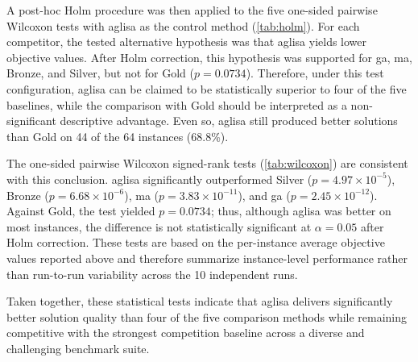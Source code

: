\documentclass[preprint,12pt]{elsarticle}
\begin{document}
A post-hoc Holm procedure was then applied to the five one-sided pairwise
Wilcoxon tests with \gls{aglisa} as the control method
(\autoref{tab:holm}). For each competitor, the tested alternative hypothesis
was that \gls{aglisa} yields lower objective values. After Holm correction, this
hypothesis was supported for \gls{ga}, \gls{ma}, Bronze, and Silver, but not
for Gold ($p = 0.0734$). Therefore, under this test configuration,
\gls{aglisa} can be claimed to be statistically superior to four of the five
baselines, while the comparison with Gold should be interpreted as a
non-significant descriptive advantage. Even so, \gls{aglisa} still produced
better solutions than Gold on 44 of the 64 instances (68.8\%).

\begin{table}[htbp]
\centering
\caption[Wilcoxon signed-rank test]{Wilcoxon signed-rank test (one-sided: AGVNS better than competitor)}
\label{tab:wilcoxon}
\end{table}

The one-sided pairwise Wilcoxon signed-rank tests
(\autoref{tab:wilcoxon}) are consistent with this conclusion. \gls{aglisa}
significantly outperformed Silver ($p = 4.97 \times 10^{-5}$), Bronze
($p = 6.68 \times 10^{-6}$), \gls{ma} ($p = 3.83 \times 10^{-11}$), and
\gls{ga} ($p = 2.45 \times 10^{-12}$). Against Gold, the test yielded
$p = 0.0734$; thus, although \gls{aglisa} was better on most instances, the
difference is not statistically significant at $\alpha = 0.05$ after Holm
correction. These tests are based on the per-instance average objective values
reported above and therefore summarize instance-level performance rather than
run-to-run variability across the 10 independent runs.

Taken together, these statistical tests indicate that \gls{aglisa} delivers
significantly better solution quality than four of the five comparison
methods while remaining competitive with the strongest competition baseline
across a diverse and challenging benchmark suite.
\end{document}
